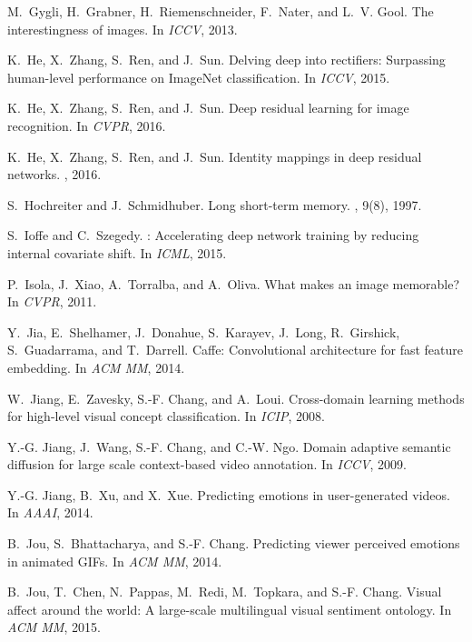 \documentclass{sig-alternate-05-2015}
\begin{document}
\begin{thebibliography}{10}
M.~Gygli, H.~Grabner, H.~Riemenschneider, F.~Nater, and L.~V. Gool.
\newblock The interestingness of images.
\newblock In {\em ICCV}, 2013.

K.~He, X.~Zhang, S.~Ren, and J.~Sun.
\newblock Delving deep into rectifiers: {S}urpassing human-level performance on
  {ImageNet} classification.
\newblock In {\em ICCV}, 2015.

K.~He, X.~Zhang, S.~Ren, and J.~Sun.
\newblock Deep residual learning for image recognition.
\newblock In {\em CVPR}, 2016.

K.~He, X.~Zhang, S.~Ren, and J.~Sun.
\newblock Identity mappings in deep residual networks.
, 2016.

S.~Hochreiter and J.~Schmidhuber.
\newblock Long short-term memory.
, 9(8), 1997.

S.~Ioffe and C.~Szegedy.
: {A}ccelerating deep network training by
  reducing internal covariate shift.
\newblock In {\em ICML}, 2015.

P.~Isola, J.~Xiao, A.~Torralba, and A.~Oliva.
\newblock What makes an image memorable?
\newblock In {\em CVPR}, 2011.

Y.~Jia, E.~Shelhamer, J.~Donahue, S.~Karayev, J.~Long, R.~Girshick,
  S.~Guadarrama, and T.~Darrell.
\newblock Caffe: {C}onvolutional architecture for fast feature embedding.
\newblock In {\em ACM MM}, 2014.

W.~Jiang, E.~Zavesky, S.-F. Chang, and A.~Loui.
\newblock Cross-domain learning methods for high-level visual concept
  classification.
\newblock In {\em ICIP}, 2008.

Y.-G. Jiang, J.~Wang, S.-F. Chang, and C.-W. Ngo.
\newblock Domain adaptive semantic diffusion for large scale context-based
  video annotation.
\newblock In {\em ICCV}, 2009.

Y.-G. Jiang, B.~Xu, and X.~Xue.
\newblock Predicting emotions in user-generated videos.
\newblock In {\em AAAI}, 2014.

B.~Jou, S.~Bhattacharya, and S.-F. Chang.
\newblock Predicting viewer perceived emotions in animated {GIF}s.
\newblock In {\em ACM MM}, 2014.

B.~Jou, T.~Chen, N.~Pappas, M.~Redi, M.~Topkara, and S.-F. Chang.
\newblock Visual affect around the world: {A} large-scale multilingual visual
  sentiment ontology.
\newblock In {\em ACM MM}, 2015.


\end{thebibliography}
\end{document}
